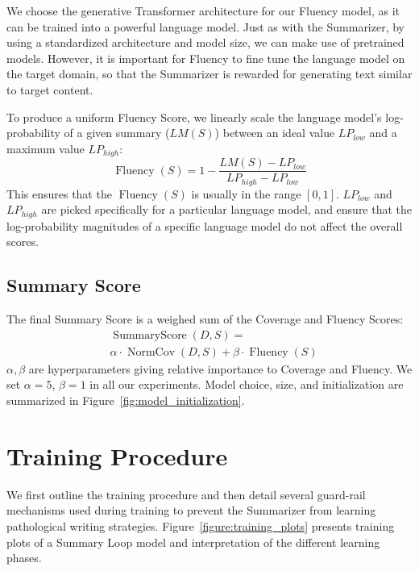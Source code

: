 \documentclass[11pt,a4paper]{article}
\DeclareMathOperator{\NormCov}{NormCov}
\DeclareMathOperator{\SummaryScore}{SummaryScore}
\DeclareMathOperator{\Fluency}{Fluency}
\begin{document}
We choose the generative Transformer \cite{radford2019language} architecture for our Fluency model, as it can be trained into a powerful language model. Just as with the Summarizer, by using a standardized architecture and model size, we can make use of pretrained models. However, it is important for Fluency to fine tune the language model on the target domain, so that the Summarizer is rewarded for generating text similar to target content.

To produce a uniform Fluency Score, we linearly scale the language model's log-probability of a given summary ($LM(S)$) between an ideal value $LP_{low}$ and a maximum value $LP_{high}$:
\begin{equation}
    \Fluency(S) = 1- \frac{LM(S) - LP_{low}}{LP_{high} - LP_{low}}
    \label{eqn:fluency}
\end{equation}
This ensures that the $\Fluency(S)$ is usually in the range $[0,1]$. $LP_{low}$ and $LP_{high}$ are picked specifically for a particular language model, and ensure that the log-probability magnitudes of a specific language model do not affect the overall scores.

\subsection{Summary Score}

The final Summary Score is a weighed sum of the Coverage and Fluency Scores:
\begin{equation}
    \begin{aligned}
    &\SummaryScore(D,S) =\\
    &\alpha \cdot \NormCov(D,S) + \beta \cdot \Fluency(S)
    \end{aligned}
\end{equation}
$\alpha, \beta$ are hyperparameters giving relative importance to Coverage and Fluency. We set $\alpha = 5$, $\beta=1$ in all our experiments. Model choice, size, and initialization are summarized in Figure~\ref{fig:model_initialization}.

\section{Training Procedure}
\label{section:training}
We first outline the training procedure and then detail several guard-rail mechanisms used during training to prevent the Summarizer from learning pathological writing strategies. 
Figure~\ref{figure:training_plots} presents training plots of a Summary Loop model and interpretation of the different learning phases.
\end{document}
